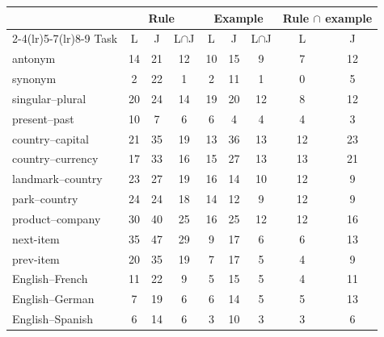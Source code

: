 \begin{tabular}{@{}lcccccccc@{}}
\toprule
 & \multicolumn{3}{c}{Rule} & \multicolumn{3}{c}{Example} & \multicolumn{2}{c}{Rule $\cap$ example} \\
\cmidrule(lr){2-4}\cmidrule(lr){5-7}\cmidrule(lr){8-9}
Task & L & J & L$\cap$J & L & J & L$\cap$J & L & J \\
\midrule
antonym & 14 & 21 & 12 & 10 & 15 & 9 & 7 & 12 \\
synonym & 2 & 22 & 1 & 2 & 11 & 1 & 0 & 5 \\
singular--plural & 20 & 24 & 14 & 19 & 20 & 12 & 8 & 12 \\
present--past & 10 & 7 & 6 & 6 & 4 & 4 & 4 & 3 \\
country--capital & 21 & 35 & 19 & 13 & 36 & 13 & 12 & 23 \\
country--currency & 17 & 33 & 16 & 15 & 27 & 13 & 13 & 21 \\
landmark--country & 23 & 27 & 19 & 16 & 14 & 10 & 12 & 9 \\
park--country & 24 & 24 & 18 & 14 & 12 & 9 & 12 & 9 \\
product--company & 30 & 40 & 25 & 16 & 25 & 12 & 12 & 16 \\
next-item & 35 & 47 & 29 & 9 & 17 & 6 & 6 & 13 \\
prev-item & 20 & 35 & 19 & 7 & 17 & 5 & 4 & 9 \\
English--French & 11 & 22 & 9 & 5 & 15 & 5 & 4 & 11 \\
English--German & 7 & 19 & 6 & 6 & 14 & 5 & 5 & 13 \\
English--Spanish & 6 & 14 & 6 & 3 & 10 & 3 & 3 & 6 \\
\bottomrule
\end{tabular}
